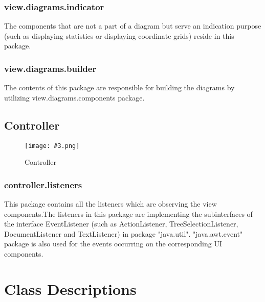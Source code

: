 \documentclass[10pt,a4paper]{report}
\newcommand{\includeimage}[5]{
    \begin{figure}[H]
        #1
        \texttt{[image: \#3.png]}
        \caption{#4}
        \label{fig:#5}
    \end{figure}
}
\begin{document}
    \subsection{view.diagrams.indicator}
    The components that are not a part of a diagram but serve an indication purpose (such as displaying statistics or displaying coordinate grids) reside in this package.
    \subsection{view.diagrams.builder}
    The contents of this package are responsible for building the diagrams by utilizing view.diagrams.components package.
    \section{Controller}
    \includeimage{}{0.062}{Controllerv}{Controller}{ControllerFirst}
    \subsection{controller.listeners}
    This package contains all the listeners which are observing the view components.The listeners in this package are implementing the subinterfaces of the interface EventListener (such as ActionListener, TreeSelectionListener, DocumentListener and TextListener) in package "java.util". "java.awt.event" package is also used for the events occurring on the corresponding UI components.

\chapter{Class Descriptions}
\end{document}
